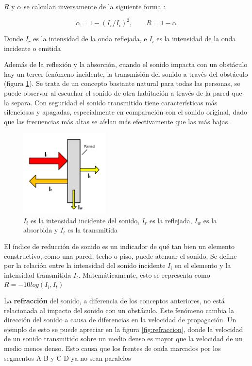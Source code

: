 \documentclass{prgrado}
\begin{document}
$R$ y $\alpha$ se calculan inversamente de la siguiente forma \cite{Moser}:

\begin{equation}
\alpha = 1 - (I_r/I_i)^2, \quad\quad R = 1 - \alpha
\end{equation}

Donde $I_r$ es la intensidad de la onda reflejada, e $I_i$ es la intensidad de la onda incidente o emitida

Además de la reflexión y la absorción, cuando el sonido impacta con un obstáculo hay un tercer fenómeno incidente, la transmisión del sonido a través del obstáculo (figura \ref{fig:interaccion}). Se trata de un concepto bastante natural para todas las personas, se puede observar al escuchar el sonido de otra habitación a través de la pared que la separa. Con seguridad el sonido transmitido tiene características más silenciosas y apagadas, especialmente en comparación con el sonido original, dado que las frecuencias más altas se aíslan más efectivamente que las más bajas \cite{Schroder}.

\begin{figure}[h!]
    \centering
    \includegraphics[width=0.4\textwidth]{figs/sound-interaction.png}
    \captionsetup{justification=centering}
    \caption{$I_i$ es la intensidad incidente del sonido, $I_r$ es la reflejada, $I_w$ es la absorbida y $I_t$ es la transmitida}
    \label{fig:interaccion}
\end{figure}

El índice de reducción de sonido es un indicador de qué tan bien un elemento constructivo, como una pared, techo o piso, puede atenuar el sonido. Se define por la relación entre la intensidad del sonido incidente $I_i$ en el elemento y la intensidad transmitida $I_t$. Matemáticamente, esto se representa como $R = -10log(I_i,I_t) $

La \textbf{refracción} del sonido, a diferencia de los conceptos anteriores, no está relacionada al impacto del sonido con un obstáculo. Este fenómeno cambia la dirección del sonido a causa de diferencias en la velocidad de propagación. Un ejemplo de esto se puede apreciar en la figura \ref{fig:refraccion}, donde la velocidad de un sonido transmitido sobre un medio denso es mayor que la velocidad de un medio menos denso. Esto causa que los frentes de onda marcados por los segmentos A-B y C-D ya no sean paralelos
\end{document}
